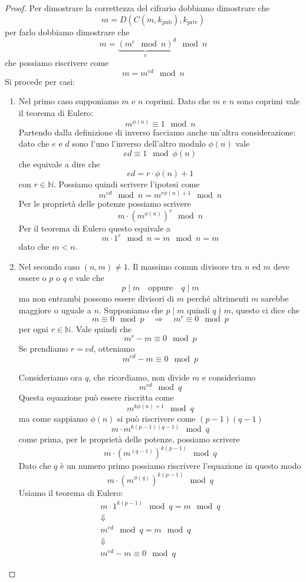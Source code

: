 \begin{proof}
	Per dimostrare la correttezza del cifrario dobbiamo dimostrare che
	\[ m = D(C(m, k_\text{pub}), k_\text{priv}) \]
	per farlo dobbiamo dimostrare che
	\[ m = {\underbrace{(m^e \mod{n})}_c}^d \mod{n} \]
	che possiamo riscrivere come
	\[ m = m^{ed} \mod{n} \]
	Si procede per casi:
	\begin{enumerate}
		\item Nel primo caso supponiamo $m$ e $n$ coprimi. Dato che $m$ e $n$ sono coprimi vale il teorema di Eulero:
		      \[ m^{\phi(n)} \equiv 1 \mod{n} \]
		      Partendo dalla definizione di inverso facciamo anche un'altra considerazione: dato che $e$ e $d$ sono
		      l'uno l'inverso dell'altro modulo $\phi(n)$ vale
		      \[ ed \equiv 1 \mod{\phi(n)} \]
		      che equivale a dire che
		      \[ ed = r \cdot \phi(n) + 1 \]
		      con $r \in \mathbb{N}$. Possiamo quindi scrivere l'ipotesi come
		      \[ m^{ed} \mod{n} = m^{r \phi(n) + 1} \mod{n} \]
		      Per le propriet\`a delle potenze possiamo scrivere
		      \[ m \cdot (m^{\phi(n)})^r \mod{n} \]
		      Per il teorema di Eulero questo equivale a
		      \[ m \cdot 1^r \mod{n} = m \mod{n} = m\]
		      dato che $m < n$.
		\item Nel secondo caso $(n, m) \neq 1$. Il massimo comun divisore tra $n$ ed $m$ deve essere o $p$ o $q$ e
		      vale che
		      \[ p \mid m \quad \text{oppure} \quad q \mid m \]
		      ma non entrambi possono essere divisori di $m$ perch\'e altrimenti $m$ sarebbe maggiore o uguale a $n$.
		      Supponiamo che $p \mid m$ quindi $q \nmid m$, questo ci dice che
		      \[ m \equiv 0 \mod{p} \quad \Rightarrow \quad m^r \equiv 0 \mod{p} \]
		      per ogni $r \in \mathbb{N}$. Vale quindi che
		      \[ m^r - m \equiv 0 \mod{p} \]
		      Se prendiamo $r = ed$, otteniamo
		      \[ m^{ed} - m \equiv 0 \mod{p} \]

		      Consideriamo ora $q$, che ricordiamo, non divide $m$ e consideriamo
		      \[ m^{ed} \mod{q} \]
		      Questa equazione pu\`o essere riscritta come
		      \[ m^{k \phi(n) + 1} \mod{q} \]
		      ma come sappiamo $\phi(n)$ si pu\`o riscrivere come $(p - 1)(q - 1)$
		      \[ m \cdot m^{k (p - 1)(q - 1)} \mod{q} \]
		      come prima, per le propriet\`a delle potenze, possiamo scrivere
		      \[ m \cdot (m^{(q - 1)})^{k (p - 1)} \mod{q} \]
		      Dato che $q$ \`e un numero primo possiamo riscrivere l'equazione in questo modo
		      \[ m \cdot (m^{\phi(q)})^{k (p - 1)} \mod{q} \]
		      Usiamo il teorema di Eulero:
		      \begin{gather*}
			      m \cdot 1^{k (p - 1)} \mod{q} = m \mod{q} \\
			      \Downarrow \\
			      m^{ed} \mod{q} = m \mod{q} \\
			      \Downarrow \\
			      m^{ed} - m \equiv 0 \mod{q}
		      \end{gather*}


\end{enumerate}
\end{proof}
